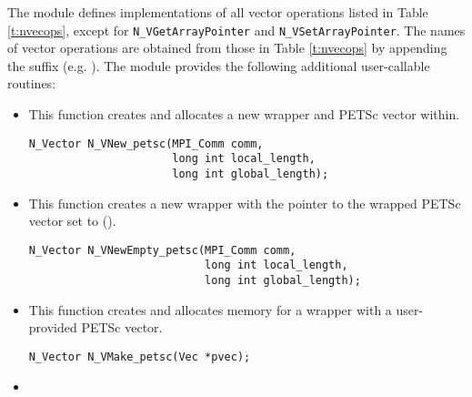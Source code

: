 The {\nvecpetsc} module defines implementations of all vector operations listed 
in Table \ref{t:nvecops}, except for \verb|N_VGetArrayPointer| and 
\verb|N_VSetArrayPointer|. The names of vector operations are obtained from those in 
Table \ref{t:nvecops} by appending the suffix  (e.g. ).
The module {\nvecpetsc}  provides the following additional user-callable routines:
\begin{itemize}


\item  {}
  
  This function creates and allocates a new {\nvector} wrapper and PETSc 
  vector within.
 
  

\begin{verbatim}
N_Vector N_VNew_petsc(MPI_Comm comm, 
                      long int local_length, 
                      long int global_length);
\end{verbatim}
  

\item {}
 
  This function creates a new {\nvector} wrapper with the pointer to
  the wrapped PETSc vector set to ().
 
  

\begin{verbatim}
N_Vector N_VNewEmpty_petsc(MPI_Comm comm, 
                           long int local_length, 
                           long int global_length);
\end{verbatim}

  

\item {}
  
  This function creates and allocates memory for a {\nvecpetsc}
  wrapper with a user-provided PETSc vector.
 
  

\begin{verbatim}
N_Vector N_VMake_petsc(Vec *pvec);
\end{verbatim}



\item {}
 

\end{itemize}
